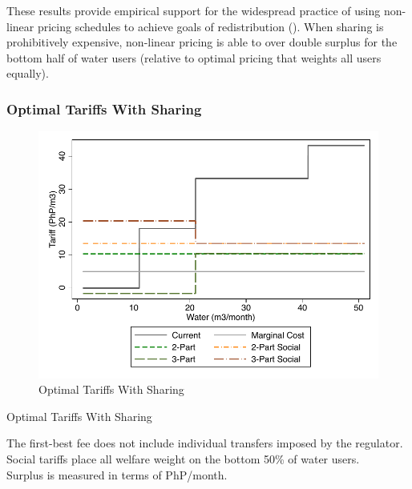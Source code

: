 \documentclass[12pt]{article}
\begin{document}
These results provide empirical support for the widespread practice of using non-linear pricing schedules to achieve goals of redistribution (\cite{hoque2013state}).  When sharing is prohibitively expensive, non-linear pricing is able to over double surplus for the bottom half of water users (relative to optimal pricing that weights all users equally).  


\subsubsection{Optimal Tariffs With Sharing}\label{section:optimaltariffswithsharing}

\begin{figure}[!htp]
\centering
\caption{Optimal Tariffs With Sharing}\label{figure:optimaltariffsharing}
\includegraphics{tables/shr_tariff_groups.pdf}
\end{figure}

\begin{table}[!hbp]
\centering
\caption{Optimal Tariffs With Sharing}\label{table:optimaltariffsharing}
\resizebox{\textwidth}{!}{%

}
\footnotesize{The first-best fee does not include individual transfers imposed by the regulator. \\  Social tariffs place all welfare weight on the bottom 50\% of water users. \\ Surplus is measured in terms of PhP/month.}
\end{table}
\end{document}
